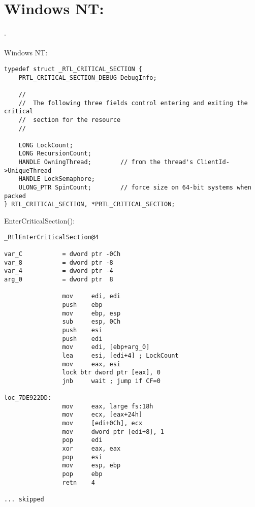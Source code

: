 \section{Windows NT: }

\label{critical_sections}

. \\
\\
  
 \gls{Windows NT}:

\begin{lstlisting}[caption=(Windows Research Kernel v1.2) public/sdk/inc/nturtl.h]
typedef struct _RTL_CRITICAL_SECTION {
    PRTL_CRITICAL_SECTION_DEBUG DebugInfo;

    //
    //  The following three fields control entering and exiting the critical
    //  section for the resource
    //

    LONG LockCount;
    LONG RecursionCount;
    HANDLE OwningThread;        // from the thread's ClientId->UniqueThread
    HANDLE LockSemaphore;
    ULONG_PTR SpinCount;        // force size on 64-bit systems when packed
} RTL_CRITICAL_SECTION, *PRTL_CRITICAL_SECTION;
\end{lstlisting}

 EnterCriticalSection():

\begin{lstlisting}[caption=Windows 2008/ntdll.dll/x86 (begin)]
_RtlEnterCriticalSection@4

var_C           = dword ptr -0Ch
var_8           = dword ptr -8
var_4           = dword ptr -4
arg_0           = dword ptr  8

                mov     edi, edi
                push    ebp
                mov     ebp, esp
                sub     esp, 0Ch
                push    esi
                push    edi
                mov     edi, [ebp+arg_0]
                lea     esi, [edi+4] ; LockCount
                mov     eax, esi
                lock btr dword ptr [eax], 0
                jnb     wait ; jump if CF=0

loc_7DE922DD:
                mov     eax, large fs:18h
                mov     ecx, [eax+24h]
                mov     [edi+0Ch], ecx
                mov     dword ptr [edi+8], 1
                pop     edi
                xor     eax, eax
                pop     esi
                mov     esp, ebp
                pop     ebp
                retn    4

... skipped
\end{lstlisting}

